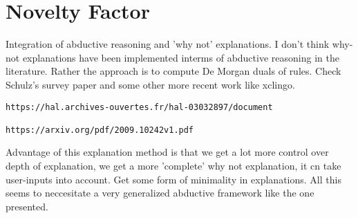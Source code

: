 \documentclass{article}
\begin{document}
\section{Novelty Factor}
Integration of abductive reasoning and 'why not' explanations. I don't think why-not explanations have been implemented interms of abductive reasoning in the literature. Rather the approach is to compute De Morgan duals of rules. Check Schulz's survey paper and some other more recent work like xclingo. 
\begin{verbatim}
https://hal.archives-ouvertes.fr/hal-03032897/document

https://arxiv.org/pdf/2009.10242v1.pdf
\end{verbatim}
Advantage of this explanation method is that we get a lot more control over depth of explanation, we get a more 'complete' why not explanation, it cn take user-inputs into account. Get some form of minimality in explanations. All this seems to neccesitate a very generalized abductive framework like the one presented.
\end{document}
